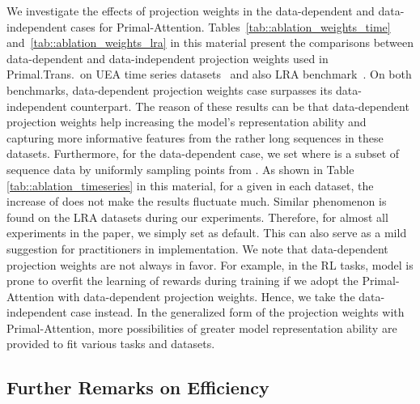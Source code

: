 \documentclass{article}
\begin{document}
We investigate the effects of projection weights in the data-dependent and data-independent cases for Primal-Attention.
Tables~\ref{tab::ablation_weights_time} and~\ref{tab::ablation_weights_lra} in this material present the comparisons  between data-dependent  and data-independent projection weights used in  Primal.Trans.~on UEA time series datasets~\cite{bagnall2018uea} and also LRA benchmark~\cite{tay2020long}.
On both benchmarks, data-dependent projection weights case surpasses its data-independent counterpart.
The reason of these results can be that data-dependent projection weights help increasing the model's representation ability and capturing more informative features from the rather long sequences in these datasets.
Furthermore, for the data-dependent case, we set  where  is a subset of sequence data by uniformly sampling   points from . 
As shown in Table \ref{tab::ablation_timeseries} in this material, for a given  in each dataset, the increase of  does not make the results fluctuate much. 
Similar phenomenon is found on the LRA datasets during our experiments.
Therefore, for almost all experiments in the paper, we simply set  as default.
This can also serve as a mild suggestion for practitioners in implementation.
We note that data-dependent projection weights are not always in favor.
For example, in the RL tasks, model is prone to overfit the learning of rewards during training if we adopt the Primal-Attention with data-dependent projection weights.
Hence, we take the data-independent case instead.
In the generalized form of the projection weights with Primal-Attention, more possibilities of greater model representation ability are provided to fit various tasks and datasets.

\subsection{Further Remarks on Efficiency}
\end{document}
